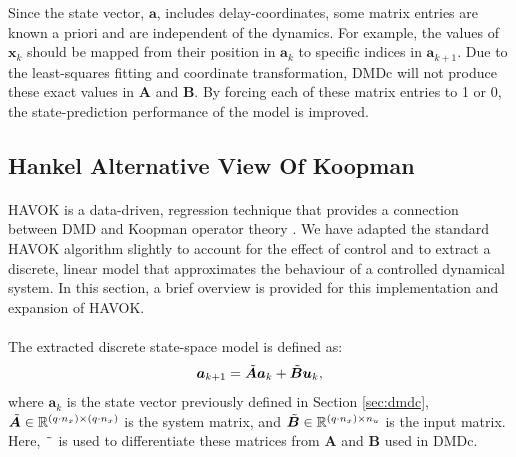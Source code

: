         Since the state vector, $\bm{a}$, includes delay-coordinates, some matrix entries are known a priori and are independent of the dynamics. For example, the values of $\bm{x}_{k}$ should be mapped from their position in $\bm{a}_k$ to specific indices in $\bm{a}_{k+1}$. Due to the least-squares fitting and coordinate transformation, DMDc will not produce these exact values in $\bm{A}$ and $\bm{B}$. By forcing each of these matrix entries to 1 or 0, the state-prediction performance of the model is improved.

        \subsection{Hankel Alternative View Of Koopman}
% 
    \paragraph{}
    HAVOK is a data-driven, regression technique that provides a connection between DMD and Koopman operator theory \cite{Brunton2017, Champion2019}. 
    We have adapted the standard HAVOK algorithm slightly to account for the effect of control and to extract a discrete, linear model that approximates the behaviour of a controlled dynamical system.
    In this section, a brief overview is provided for this implementation and expansion of \mbox{HAVOK}.
    \paragraph{}
    The extracted discrete state-space model is defined as:
    \begin{equation} \label{eq:havoc_state_space}
        \bm{a}_{k+1} = \Tilde{\bm{A}} \bm{a}_k + \Tilde{\bm{B}} \bm{u}_k ,
    \end{equation}
    where $\bm{a}_k$ is the state vector previously defined in Section \ref{sec:dmdc}, 
    \( \Tilde{\bm{A}} \in \mathbb{R}^{(q \cdot n_x) \times (q \cdot n_x)} \) is the system matrix, 
    and \( \Tilde{\bm{B}} \in \mathbb{R}^{(q \cdot n_x) \times n_u} \) is the input matrix. 
    Here, $\Tilde{\phantom{a}}$ is used to differentiate these matrices from $\bm{A}$ and $\bm{B}$ used in DMDc.
